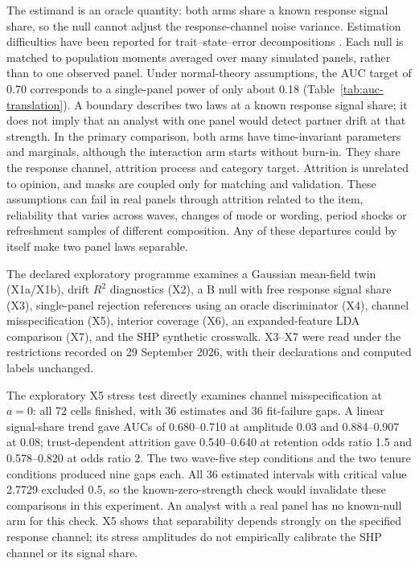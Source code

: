 The estimand is an oracle quantity: both arms share a known response signal share, so the null cannot adjust the response-channel noise variance. Estimation difficulties have been reported for trait--state--error decompositions \cite{cole2005tso,ludtke2018starts}. Each null is matched to population moments averaged over many simulated panels, rather than to one observed panel. Under normal-theory assumptions, the AUC target of 0.70 corresponds to a single-panel power of only about 0.18 (Table~\ref{tab:auc-translation}). A boundary describes two laws at a known response signal share; it does not imply that an analyst with one panel would detect partner drift at that strength. In the primary comparison, both arms have time-invariant parameters and marginals, although the interaction arm starts without burn-in. They share the response channel, attrition process and category target. Attrition is unrelated to opinion, and masks are coupled only for matching and validation. These assumptions can fail in real panels through attrition related to the item, reliability that varies across waves, changes of mode or wording, period shocks or refreshment samples of different composition. Any of these departures could by itself make two panel laws separable. %

The declared exploratory programme examines a Gaussian mean-field twin (X1a/X1b), drift $R^2$ diagnostics (X2), a B null with free response signal share (X3), single-panel rejection references using an oracle discriminator (X4), channel misspecification (X5), interior coverage (X6), an expanded-feature LDA comparison (X7), and the SHP synthetic crosswalk. %
X3--X7 were read under the restrictions recorded on 29 September 2026, with their declarations and computed labels unchanged. %

The exploratory X5 stress test directly examines channel misspecification at $a=0$: all 72 cells finished, with 36 estimates and 36 fit-failure gaps. %
A linear signal-share trend gave AUCs of 0.680--0.710 at amplitude 0.03 and 0.884--0.907 at 0.08; trust-dependent attrition gave 0.540--0.640 at retention odds ratio 1.5 and 0.578--0.820 at odds ratio 2. %
The two wave-five step conditions and the two tenure conditions produced nine gaps each. %
All 36 estimated intervals with critical value 2.7729 excluded 0.5, so the known-zero-strength check would invalidate these comparisons in this experiment. %
An analyst with a real panel has no known-null arm for this check. %
X5 shows that separability depends strongly on the specified response channel; its stress amplitudes do not empirically calibrate the SHP channel or its signal share. %

